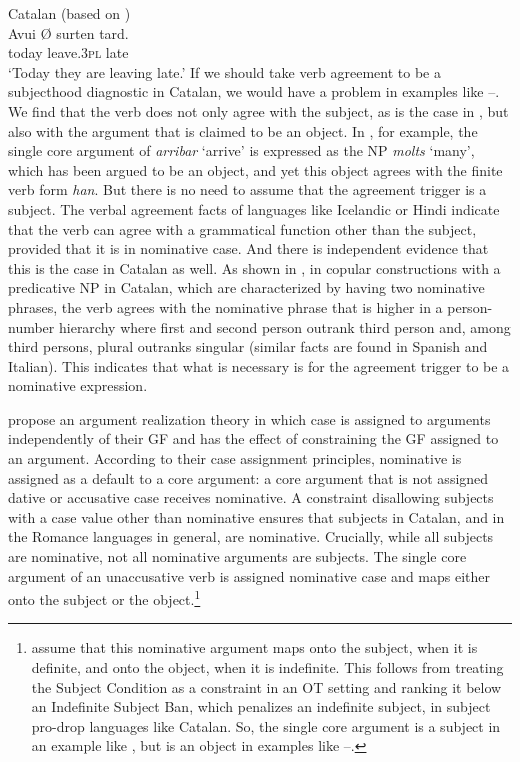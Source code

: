 \documentclass[output=paper,hidelinks]{langscibook}
\begin{document}
\ea\label{ex:Romance:41}   Catalan (based on \citealt[50]{AlsinaYang2018})\\
\gll
Avui Ø surten tard.\\
today {} leave.\textsc{3pl} late\\
\glt   `Today they are leaving late.'
\z
If we should take verb agreement to be a subjecthood diagnostic in Catalan, we would have a problem in examples like --. We find that the verb does not only agree with the subject, as is the case in , but also with the argument that is claimed to be an object. In , for example, the single core argument of \textit{arribar} `arrive' is expressed as the NP \textit{molts} `many', which has been argued to be an object, and yet this object agrees with the finite verb form \textit{han}. But there is no need to assume that the agreement trigger is a subject. The verbal agreement facts of languages like Icelandic or Hindi indicate that the verb can agree with a grammatical function other than the subject, provided that it is in nominative case. And there is independent evidence that this is the case in Catalan as well. As shown in \citet{AV:LFG14}, in copular constructions with a predicative NP in Catalan, which are characterized by having two nominative phrases, the verb agrees with the nominative phrase that is higher in a person-number hierarchy where first and second person outrank third person and, among third persons, plural outranks singular (similar facts are found in Spanish and Italian). This indicates that what is necessary is for the agreement trigger to be a nominative expression.

\citet{AlsinaYang2018} propose an argument realization theory in which
case is assigned to arguments independently of their GF and has the effect of constraining the GF assigned to an argument. According to their case assignment principles, nominative is assigned as a default to a core argument: a core argument that is not assigned dative or accusative case receives nominative. A constraint disallowing subjects with a case value other than nominative ensures that subjects in Catalan, and in the Romance languages in general, are nominative. Crucially, while all subjects are nominative, not all nominative arguments are subjects. The single core argument of an unaccusative verb is assigned nominative case and maps either onto the subject or the object.\footnote{\citet{AlsinaYang2018} assume that this nominative argument maps onto the subject, when it is definite, and onto the object, when it is indefinite. This follows from treating the Subject Condition as a constraint in an OT setting and ranking it below an Indefinite Subject Ban, which penalizes an indefinite subject, in subject pro-drop languages like Catalan. So, the single core argument is a subject in an example like , but is an object in examples like --.} 
\end{document}
